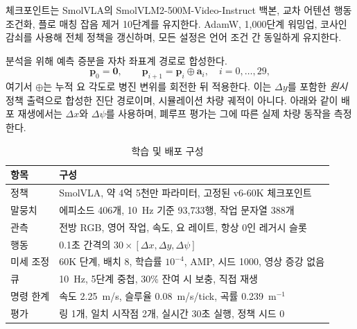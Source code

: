 \documentclass[letterpaper,conference]{IEEEtran}
\begin{document}
체크포인트는 SmolVLA의 SmolVLM2-500M-Video-Instruct 백본, 교차 어텐션 행동 조건화,
플로 매칭 잡음 제거 10단계를 유지한다. AdamW, 1,000단계 워밍업, 코사인 감쇠를
사용해 전체 정책을 갱신하며, 모든 설정은 언어 조건 간 동일하게 유지한다.

분석을 위해 예측 증분을 자차 좌표계 경로로 합성한다.
\begin{equation}
\mathbf{p}_0=\mathbf{0},\qquad
\mathbf{p}_{i+1}=\mathbf{p}_i\oplus\mathbf{a}_i,\quad i=0,\ldots,29,
\label{eq:compose}
\end{equation}
여기서 $\oplus$는 누적 요 각도로 병진 변위를 회전한 뒤 적용한다. 이는 $\Delta y$를
포함한 \emph{원시} 정책 출력으로 합성한 진단 경로이며, 시뮬레이션 차량 궤적이 아니다.
아래와 같이 배포 재생에서는 $\Delta x$와 $\Delta\psi$를 사용하며, 폐루프 평가는 그에
따른 실제 차량 동작을 측정한다.

\begin{table}[!ht]
\caption{학습 및 배포 구성}
\label{tab:configuration}
\centering
\footnotesize
\setlength{\tabcolsep}{3.0pt}
\begin{tabular}{@{}L{0.25\columnwidth}L{0.67\columnwidth}@{}}
\toprule
항목 & 구성 \\
\midrule
정책 & SmolVLA, 약 4억 5천만 파라미터, 고정된 v6-60K 체크포인트 \\
말뭉치 & 에피소드 406개, 10~Hz 기준 93,733행, 작업 문자열 388개 \\
관측 & 전방 RGB, 영어 작업, 속도, 요 레이트, 항상 0인 레거시 슬롯 \\
행동 & 0.1초 간격의 $30\times[\Delta x,\Delta y,\Delta\psi]$ \\
미세 조정 & 60K 단계, 배치 8, 학습률 $10^{-4}$, AMP, 시드 1000, 영상 증강 없음 \\
큐 & 10~Hz, 5단계 중첩, 30\% 잔여 시 보충, 직접 재생 \\
명령 한계 & 속도 2.25~m/s, 슬루율 0.08~m/s/tick, 곡률 0.239~m$^{-1}$ \\
평가 & 링 1개, 일치 시작점 2개, 실시간 30초 실행, 정책 시드 0 \\
\bottomrule
\end{tabular}
\end{table}
\end{document}
